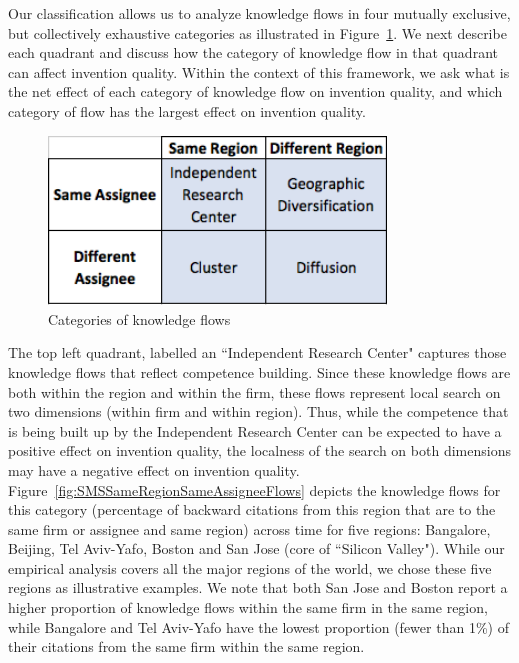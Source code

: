 \documentclass[12pt,letterpaper]{article}
\begin{document}
Our classification allows us to analyze knowledge flows in four mutually exclusive, but collectively exhaustive categories as illustrated in Figure~\ref{fig:2x2}. We next describe each quadrant and discuss how the category of knowledge flow in that quadrant can affect invention quality. Within the context of this framework, we ask what is the net effect of each category of knowledge flow on invention quality, and which category of flow has the largest effect on invention quality. \par
\begin{figure}[h!]
\begin{centering}
  \caption{Categories of knowledge flows}
  \label{fig:2x2}
  \includegraphics[width=0.8\textwidth]{2x2}
\end{centering}
\end{figure}

The top left quadrant, labelled an ``Independent Research Center" captures those knowledge flows that reflect competence building. Since these knowledge flows  are both within the region and within the firm, these flows represent local search on two dimensions (within firm and within region).  Thus, while the competence that is being built up by the Independent Research Center can be expected to have a positive effect on invention quality, the localness of the search on both dimensions may have a negative effect on invention quality. Figure~\ref{fig:SMSSameRegionSameAssigneeFlows} depicts the knowledge flows for this category (percentage of backward citations from this region that are to the same firm or assignee and same region) across time for five regions: Bangalore, Beijing, Tel Aviv-Yafo, Boston and San Jose (core of ``Silicon Valley"). While our empirical analysis covers all the major regions of the world, we chose these five regions as illustrative examples. We note that both San Jose and Boston report a higher proportion of knowledge flows within the same firm in the same region, while Bangalore and Tel Aviv-Yafo have the lowest proportion (fewer than 1\%) of their citations from the same firm within the same region. \par
\end{document}
